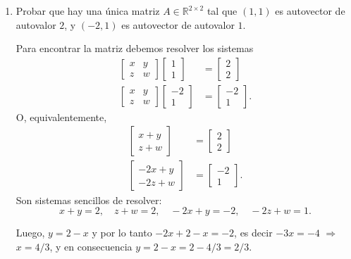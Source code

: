     
    
    \begin{enumerate}[resume,topsep=6pt,itemsep=.4cm]
    
    \item Probar que hay una única matriz $A\in\mathbb{R}^{2\times 2}$ tal que $(1,1)$ es autovector de autovalor $2$, y $(-2,1)$ es autovector de autovalor $1$.
    
    \rta Para encontrar la matriz debemos resolver los sistemas
    \begin{align*}
        \begin{bmatrix} x & y\\ z & w \end{bmatrix} \begin{bmatrix} 1\\ 1 \end{bmatrix} &= \begin{bmatrix} 2\\ 2 \end{bmatrix} \\
        \begin{bmatrix}x &y\\z &w \end{bmatrix} \begin{bmatrix} -2\\ 1 \end{bmatrix} &= \begin{bmatrix} -2\\ 1 \end{bmatrix}.
    \end{align*}
    O, equivalentemente, 
    \begin{align*}
        \begin{bmatrix}x+y\\z+w \end{bmatrix} &= \begin{bmatrix} 2 \\ 2\end{bmatrix} \\
        \begin{bmatrix} -2x +y\\ -2z +w \end{bmatrix} &= \begin{bmatrix} -2 \\ 1\end{bmatrix}.
    \end{align*}
    Son sistemas sencillos de resolver: 
    $$x+y=2,\quad z+w=2,\quad -2x+y=-2,\quad -2z+w=1.$$ 
    
    Luego, $y = 2-x$ y por lo tanto $-2x+2-x=-2$, es decir  $-3x=-4$ $\Rightarrow$ $x = 4/3$, y  en consecuencia $y =2-x = 2- 4/3=2/3$. 


\end{enumerate}

